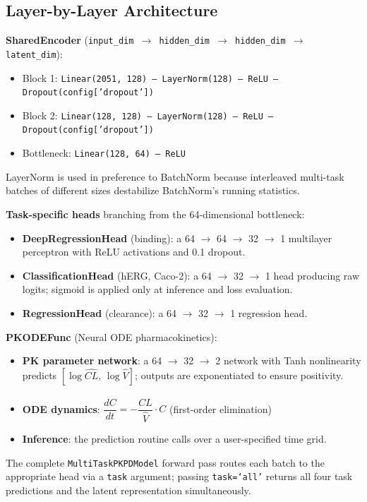 \documentclass[a4paper,11pt,twoside]{report}
\begin{document}
\subsection{Layer-by-Layer Architecture}

\textbf{SharedEncoder} (\texttt{input\_dim $\to$ hidden\_dim $\to$ hidden\_dim $\to$ latent\_dim}):
\begin{itemize}
  \item Block 1: \texttt{Linear(2051, 128) -- LayerNorm(128) -- ReLU -- Dropout(config['dropout'])}
  \item Block 2: \texttt{Linear(128, 128) -- LayerNorm(128) -- ReLU -- Dropout(config['dropout'])}
  \item Bottleneck: \texttt{Linear(128, 64) -- ReLU}
\end{itemize}
LayerNorm is used in preference to BatchNorm because interleaved multi-task batches of different sizes destabilize BatchNorm's running statistics.

\noindent \textbf{Task-specific heads} branching from the 64-dimensional bottleneck:
\begin{itemize}
  \item \textbf{DeepRegressionHead} (binding): a 64 $\to$ 64 $\to$ 32 $\to$ 1 multilayer perceptron with ReLU activations and 0.1 dropout.
  \item \textbf{ClassificationHead} (hERG, Caco-2): a 64 $\to$ 32 $\to$ 1 head producing raw logits; sigmoid is applied only at inference and loss evaluation.
  \item \textbf{RegressionHead} (clearance): a 64 $\to$ 32 $\to$ 1 regression head.
\end{itemize}

\noindent \textbf{PKODEFunc} (Neural ODE pharmacokinetics):
\begin{itemize}
  \item \textbf{PK parameter network}: a 64 $\to$ 32 $\to$ 2 network with Tanh nonlinearity predicts $[\log \widehat{CL},\, \log \widehat{V}]$; outputs are exponentiated to ensure positivity.
  \item \textbf{ODE dynamics}: $\dfrac{dC}{dt} = -\dfrac{\widehat{CL}}{\widehat{V}} \cdot C$ (first-order elimination)
  \item \textbf{Inference}: the prediction routine calls  over a user-specified time grid.
\end{itemize}

The complete \texttt{MultiTaskPKPDModel} forward pass routes each batch to the appropriate head via a \texttt{task} argument; passing \texttt{task=`all'} returns all four task predictions and the latent representation simultaneously.
\end{document}
